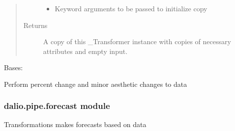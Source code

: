 \documentclass[letterpaper,10pt,english]{sphinxmanual}
\begin{document}
\begin{fulllineitems}
\begin{fulllineitems}
\begin{quote}
\begin{description}
\begin{itemize}
\item {} 
 \textendash{} Keyword arguments to be passed to initialize copy

\end{itemize}

\item[{Returns}] \leavevmode
A copy of this \_Transformer instance with copies of necessary
attributes and empty input.

\end{description}\end{quote}

\end{fulllineitems}


\end{fulllineitems}


\begin{fulllineitems}
\label{\detokenize{dalio.pipe:dalio.pipe.col_generation.StockReturns}}
Bases: {\hyperref[\detokenize{beginners-guide:dalio.pipe.col_generation._ColGeneration}]{}}

Perform percent change and minor aesthetic changes to data

\end{fulllineitems}



\subsubsection{dalio.pipe.forecast module}
\label{\detokenize{dalio.pipe:module-dalio.pipe.forecast}}\label{\detokenize{dalio.pipe:dalio-pipe-forecast-module}}
Transformations makes forecasts based on data
\end{document}

